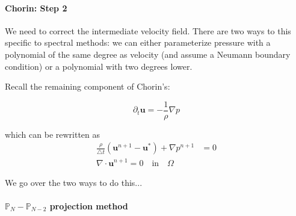 \documentclass[12pt]{article}
\begin{document}
\paragraph{Chorin: Step 2} We need to correct the intermediate velocity field. There are two ways to this specific to spectral methods: we can either parameterize pressure with a polynomial of the same degree as velocity (and assume a Neumann boundary condition) or a polynomial with two degrees lower.

Recall the remaining component of Chorin's:

\begin{equation}
    \partial_t \mathbf{u} = -\frac{1}{\rho}\nabla p
\end{equation}

which can be rewritten as
\begin{align*}
    \frac{\rho}{\bigtriangleup t}(\mathbf{u}^{n+1} - \mathbf{u}^*) + \nabla p^{n+1} &= 0 \\
    \nabla \cdot \mathbf{u}^{n+1} = 0 \quad \text{in}\quad \Omega
\end{align*}

We go over the two ways to do this...

\paragraph{$\mathbb{P}_N - \mathbb{P}_{N-2}$ projection method}
\end{document}
